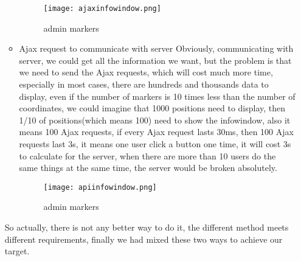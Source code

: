 \begin{itemize}
\begin{itemize}
\begin{figure}[h!]
\centering
\texttt{[image: ajaxinfowindow.png]}
\caption{admin markers }
\label{fig-sample}
\end{figure}
\item{Ajax request to communicate with server}
Obviously, communicating with server, we could get all the information we want, but the problem is that we need to send the Ajax requests, which will cost much more time, especially in most cases, there are hundreds and thousands data to display, even if the number of markers is 10 times less than the number of coordinates, we could imagine that 1000 positions need to display, then 1/10 of positions(which means 100) need to show the infowindow, also it means 100 Ajax requests, if every Ajax request lasts 30ms, then 100 Ajax requests last 3s, it means one user click a button one time, it will cost 3s to calculate for the server, when there are more than 10 users do the same things at the same time, the server would be broken absolutely.
\begin{figure}[h!]
\centering
\texttt{[image: apiinfowindow.png]}
\caption{admin markers }
\label{fig-sample}
\end{figure}
\end{itemize}
So actually, there is not any better way to do it, the different method meets different requirements, finally we had mixed these two ways to achieve our target.
\end{itemize}